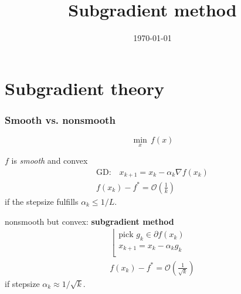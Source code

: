 \documentclass{beamer}
\title{Subgradient method}
\date{\today}
\begin{document}
\maketitle
\frame{\tableofcontents[currentsection]}

\section{Subgradient theory}%

\begin{frame}
  \frametitle{Smooth vs. nonsmooth}

  \begin{equation}
    \min_x \, f(x)
  \end{equation}

  \begin{minipage}{0.45\textwidth}
    \begin{block}{$f$ is \emph{smooth} and convex}
      \begin{equation}
        \begin{aligned}
          \text{GD:} \quad x_{k+1} = x_k - \alpha_k \nabla f(x_k) \\
          f(x_k) - f^* = \mathcal{O}(\frac{1}{k})
        \end{aligned}
      \end{equation}
      if the stepsize fulfills $\alpha_k \le 1/L$.
    \end{block}
  \end{minipage}
  \hfill
  \begin{minipage}{0.45\textwidth}
    \begin{block}{nonsmooth but convex: \textbf{subgradient method}}
      \begin{equation}
        \begin{aligned}
          \left\lfloor \begin{array}{l}
                   \text{pick $g_k \in \partial f(x_k)$}\\
                   x_{k+1} = x_k - \alpha_k g_k \\
                 \end{array}\right.\\
               f(x_k) - f^* = \mathcal{O}\left(\frac{1}{\sqrt{k}}\right)
             \end{aligned}
           \end{equation}
           if stepsize $\alpha_k \approx 1/\sqrt{k}$.
         \end{block}
       \end{minipage}

\end{frame}
\end{document}
